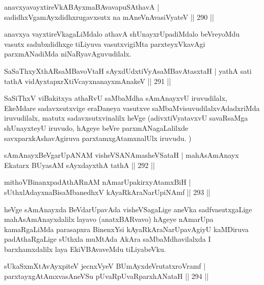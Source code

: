 \begin{shl}
anavxyavayxtireVkABAyxmaBAvavapuSA\s thavA |
sadidhxVgamAyxdidhxrugavxsutx na mAneVnAvasiVyateV \hfill || 290 ||
\end{shl}

\begin{artha}
anavxya vayxtireVkagaLiMdalo athavA shUnayxrUpadiMdalo beVre\-yoMdu vasutx sadubxdidhxge tiLiyuva vasutxvigiMta parxteyxVkavAgi parxmANadiMda niNaRya\-vAguvudilalx.
\end{artha}

\begin{shl}
SaSaThxyXthARsaMBavoV\s taH sAyxdUdxtiVyAsaMBavAtasxtaH |
yathA sati tathA vidAyxtapxrXtiVcayxnanayxmAnakeV \hfill || 291 ||
\end{shl}

\begin{artha}
SaSiThxV viBakitxya athaRvU saMbaMdha sAmAnayxvU iruvudilalx, EkeMdare sadavxsutxvige eraDaneya vasutxve saMbaMvisuvudilalxvAdadxriMda iruvudilalx, matutx sadavxsutxvinalilx heVge (adivxtiVyatavxvU savaRsaMga shUnayxteyU iruvudo, hAgeye beVre parxmANagaLalilxde savxparxkAshavAgiruva parxtamxgAtamxnalUlx iruvudu.	)
\end{artha}


\begin{shl}
sAmAnayxBeVgarUpANAM visheVSANAmasheVSataH |
mahAsAmAnayx Ekatarx BUyasAM sAyxdayxthA tathA \hfill || 292 ||
\end{shl}
\begin{shl}
mithoVBinanxpadAthARnAM nAmarUpakirxyAtamxBiH |
sUthxlAdayxnaBisaMbanedhxV kAyaRkAraNarUpiNAmf \hfill || 293 ||
\end{shl}

\begin{artha}
heVge sAmAnayxda BeVdarUpavAda visheVSagaLige aneVka sadfvasutxgaLige mahA\-sAmAnayxdalilx layavo (anatxBARvavo) hAgeye nAmarUpa kamaRgaLiMda parasapxra BinenxYsi kAyaRkAraNarUpavAgiyU kaMDiruva padAthaRgaLige sUthxla muMtAda AkAra saMbaMdhavilalxda I barxhamxdalilx laya EkiVBAvaveMdu tiLiyabeVku.
\end{artha}


\begin{shl}
sUkaSxmXtAvAyxpiteV jecnxVyeV BUmAyxdeVrutatxroVramf |
parxtayxgAtAmxvasAneVSu pUvaRpUvaRparxhANataH \hfill || 294 ||
\end{shl}

